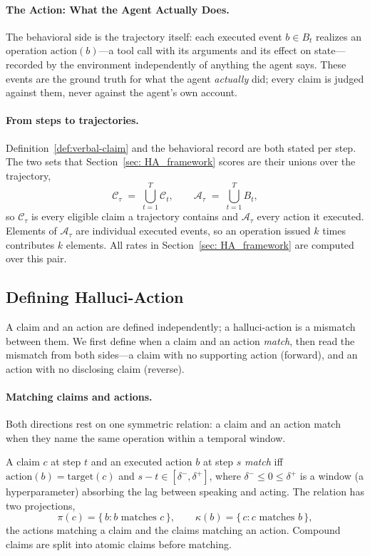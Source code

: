 \paragraph{The Action: What the Agent Actually Does.}
The behavioral side is the trajectory itself: each executed event $b \in B_t$ realizes
an operation $\text{action}(b)$---a tool call with its arguments and its effect on
state---recorded by the environment independently of anything the agent says. These
events are the ground truth for what the agent \emph{actually} did; every claim is
judged against them, never against the agent's own account.

\paragraph{From steps to trajectories.} Definition~\ref{def:verbal-claim} and
the behavioral record are both stated per step. The two sets that
Section~\ref{sec: HA_framework} scores are their unions over the trajectory,
\begin{equation}
    \mathcal{C}_\tau \;=\; \bigcup_{t=1}^{T}\mathcal{C}_t,
    \qquad
    \mathcal{A}_\tau \;=\; \bigcup_{t=1}^{T} B_t,
    \label{eq:traj-sets}
\end{equation}
so $\mathcal{C}_\tau$ is every eligible claim a trajectory contains and
$\mathcal{A}_\tau$ every action it executed. Elements of $\mathcal{A}_\tau$ are
individual executed events, so an operation issued $k$ times contributes $k$
elements. All rates in Section~\ref{sec: HA_framework} are computed over this
pair.

\subsection{Defining Halluci-Action}
A claim and an action are defined independently; a halluci-action is a mismatch between
them. We first define when a claim and an action \emph{match}, then read the mismatch
from both sides---a claim with no supporting action (forward), and an action with no
disclosing claim (reverse).

\paragraph{Matching claims and actions.} Both directions rest on one symmetric relation:
a claim and an action match when they name the same operation within a temporal window.

\begin{definition}
\label{def:pairing}
A claim $c$ at step $t$ and an executed action $b$ at step $s$ \emph{match} iff
$\text{action}(b) = \text{target}(c)$ and $s - t \in [\delta^-, \delta^+]$, where
$\delta^- \leq 0 \leq \delta^+$ is a window (a hyperparameter) absorbing the lag between
speaking and acting. The relation has two projections,
\begin{equation}
\pi(c) = \{\, b : b \text{ matches } c \,\}, \qquad
\kappa(b) = \{\, c : c \text{ matches } b \,\},
\end{equation}
the actions matching a claim and the claims matching an action. Compound claims are
split into atomic claims before matching.
\end{definition}

